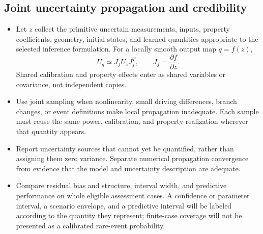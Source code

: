 \subsection{Joint uncertainty propagation and credibility}\label{subsec:joint-uncertainty-propagation}
\begin{itemize}[leftmargin=*]
\item Let $z$ collect the primitive uncertain measurements, inputs, property coefficients, geometry, initial states, and learned quantities appropriate to the selected inference formulation. For a locally smooth output map $q=f(z)$,
\begin{equation}
U_q\simeq J_f U_z J_f^T,\qquad J_f=\frac{\partial f}{\partial z}.
\label{eq:covariance-propagation}
\end{equation}
Shared calibration and property effects enter as shared variables or covariance, not independent copies.\cite{jcgm2011vectorcovariance,jcgm2020measurementmodels}
\item Use joint sampling when nonlinearity, small driving differences, branch changes, or event definitions make local propagation inadequate. Each sample must reuse the same power, calibration, and property realization wherever that quantity appears.
\item Report uncertainty sources that cannot yet be quantified, rather than assigning them zero variance. Separate numerical propagation convergence from evidence that the model and uncertainty description are adequate.
\item Compare residual bias and structure, interval width, and predictive performance on whole eligible assessment cases. A confidence or parameter interval, a scenario envelope, and a predictive interval will be labeled according to the quantity they represent; finite-case coverage will not be presented as a calibrated rare-event probability.\cite{oliver2014unobserved}
\end{itemize}
